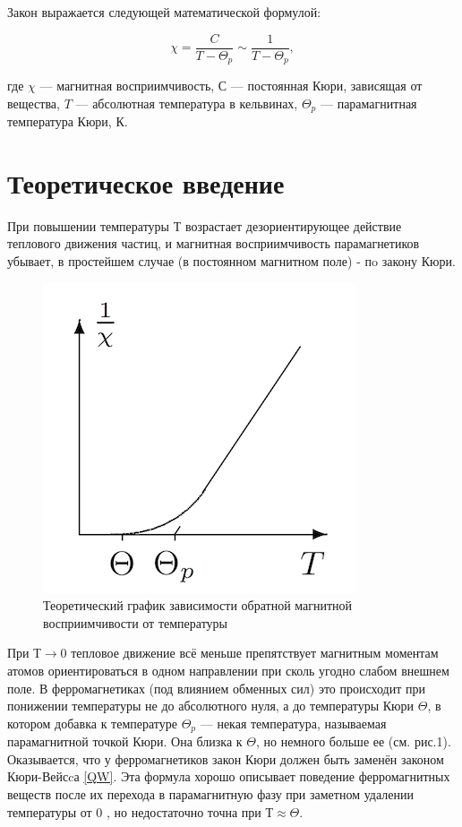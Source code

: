 \documentclass[12pt]{kiarticle}
\begin{document}
Закон выражается следующей математической формулой:

 \begin{equation}\label{QW}
 \chi ={\frac  {C}{T-\Theta_p}} \sim \frac{1}{T - \Theta_p}, 
 \end{equation}
 
где $ \chi  $ — магнитная восприимчивость, $ С $ — постоянная Кюри, зависящая от вещества, $ T $ — абсолютная температура в кельвинах, $ \Theta_p  $ — парамагнитная температура Кюри, К.

\section{Теоретическое введение}

При повышении температуры $ Т $ возрастает дезориентирующее действие теплового движения частиц, и магнитная восприимчивость парамагнетиков
убывает, в простейшем случае (в постоянном магнитном
поле) - пo закону Кюри.

\begin{figure} 
	\includegraphics{342_gr}
	\caption{Теоретический график зависимости обратной магнитной восприимчивости от температуры}
\end{figure}

При $ Т \to 0 $ тепловое движение всё меньше препятствует магнитным моментам атомов ориентироваться в одном направлении при сколь
угодно слабом внешнем поле. В ферромагнетиках (под влиянием обменных сил) это происходит при понижении температуры не до абсолютного
нуля, а до температуры Кюри $ \Theta $, в котором добавка к температуре $ \Theta_p $ --- некая температура, называемая парамагнитной точкой Кюри. Она близка к $ \Theta $, но немного больше ее (см. рис.1). Оказывается, что у ферромагнетиков закон Кюри должен быть заменён законом Кюри-Вейсcа \eqref{QW}. Эта формула хорошо описывает поведение ферромагнитных  веществ после их перехода в парамагнитную фазу при заметном удалении температуры от 0 , но недостаточно точна при $ Т \approx \Theta$.
\end{document}
